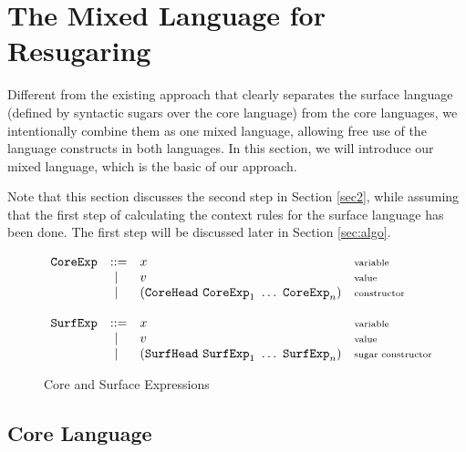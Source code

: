 \section{The Mixed Language for Resugaring}
\label{sec:language}

Different from the existing approach that clearly separates the surface language (defined by syntactic sugars over the core language) from the core languages, we intentionally combine them as one mixed language, allowing free use of the language constructs in both languages. In this section, we will introduce our mixed language, which is the basic of our approach.

Note that this section discusses the second step in Section \ref{sec2}, while
assuming that the first step of calculating the context rules for the surface language has been done. The first step will be discussed later in Section \ref{sec:algo}.


\begin{figure}[t]
	\begin{flushleft}
	{\footnotesize
	\[
	\begin{array}{lllll}
	\mbox{\tt CoreExp} &::=& x  & \mbox{{\scriptsize variable}}\\
	&~|~& v  & \mbox{{\scriptsize value}}\\
	&~|~& (\mbox{\tt CoreHead}~\mbox{\tt CoreExp}_1~\ldots~\mbox{\tt CoreExp}_n) & \mbox{{\scriptsize constructor}}\\
	\\
	\mbox{\tt SurfExp} &::=& x  & \mbox{{\scriptsize variable}}\\
	&~|~& v  & \mbox{{\scriptsize value}}\\
	&~|~& (\mbox{\tt SurfHead}~\mbox{\tt SurfExp}_1~\ldots~\mbox{\tt SurfExp}_n) & \mbox{{\scriptsize sugar constructor}}\\
	\end{array}
	\]
	}
	\end{flushleft}


		\caption{Core and Surface Expressions}
		\label{fig:expression}
	\end{figure}

\subsection{Core Language}

